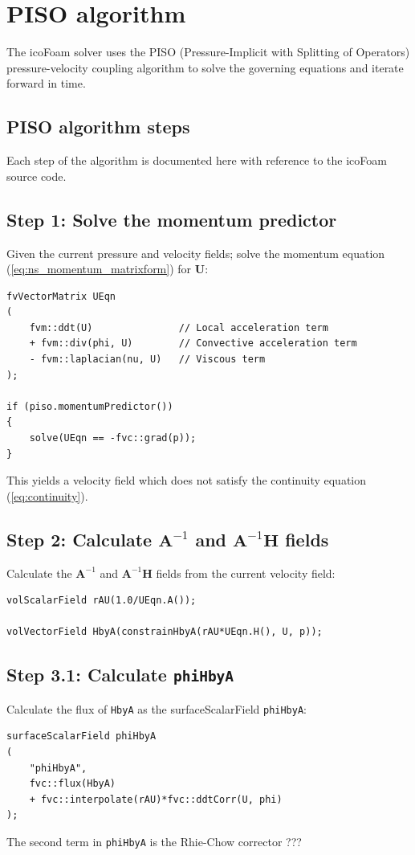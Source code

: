 \documentclass[a4paper,11pt]{report}
\begin{document}
\section{PISO algorithm} \label{sec:PISO_algorithm}
The icoFoam solver uses the PISO (Pressure-Implicit with Splitting of Operators) pressure-velocity coupling algorithm to solve the governing equations and iterate forward in time.
\subsection{PISO algorithm steps}
Each step of the algorithm is documented here with reference to the icoFoam source code.
\subsection*{Step 1: Solve the momentum predictor}
Given the current pressure and velocity fields; solve the momentum equation (\ref{eq:ns_momentum_matrixform}) for $\mathbf{U}$:
\begin{verbatim}
fvVectorMatrix UEqn
(
    fvm::ddt(U)               // Local acceleration term
    + fvm::div(phi, U)        // Convective acceleration term
    - fvm::laplacian(nu, U)   // Viscous term
);

if (piso.momentumPredictor())
{
    solve(UEqn == -fvc::grad(p));
}
\end{verbatim}
This yields a velocity field which does not satisfy the continuity equation (\ref{eq:continuity}).

\subsection*{Step 2: Calculate $\mathbf{A}^{-1}$ and $\mathbf{A}^{-1}\mathbf{H}$ fields}
Calculate the $\mathbf{A}^{-1}$ and $\mathbf{A}^{-1}\mathbf{H}$ fields from the current velocity field:
\begin{verbatim}
volScalarField rAU(1.0/UEqn.A());

volVectorField HbyA(constrainHbyA(rAU*UEqn.H(), U, p));
\end{verbatim}

\subsection*{Step 3.1: Calculate \texttt{phiHbyA}}
Calculate the flux of \texttt{HbyA} as the surfaceScalarField \texttt{phiHbyA}:
\begin{verbatim}
surfaceScalarField phiHbyA
(
    "phiHbyA",
    fvc::flux(HbyA)
    + fvc::interpolate(rAU)*fvc::ddtCorr(U, phi)
);
\end{verbatim}
The second term in \texttt{phiHbyA} is the Rhie-Chow corrector \cite{Rhie1983}???
\end{document}

